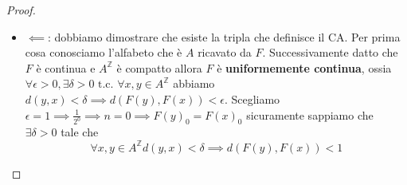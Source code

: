 \begin{teorema} 
\begin{proof}
\begin{itemize}
                  con $\delta=\frac{1}{2^{n+r}}$ è vera. Perché per la prima proprietà
                  della distanza e per la sua definizione (vedi nota \ref{prop:dist}) abbiamo che $d(F(y),F(x)) < \frac{1}{2^{n}}$
                  quindi significa che $F(x)_{[-n,n]} = F(y)_{[-n,n]}$ quindi per
                  $\delta=\frac{1}{2^{n+r}}$ è vero che $d(y,x) < \frac{1}{2^{n+r}}$
                  che significa sempre per la stessa proprietà che $x_{[-n-r,n+r]} = y_{[-n-r,n+r]}$.
                  Tutto viene spiegato dal fatto che se non fossero uguali le sottosequenze
                  di $x$ e $y$ allora non possono essere uguali le sottosequenze di $F(x), F(y)$.
                  Abbiamo dimostrato la continuità.

                  Successivamente dimostriamo $F\circ \sigma = \sigma \circ F\implies F(\sigma(x)) = \sigma(F(x)), \forall x \in A^\mathbb{Z}$.
                  l'uguaglianza precedente può essere riscritta come $\forall x \in A^\mathbb{Z}, \forall i \in \mathbb{Z}, (F(\sigma(x)))_i =(\sigma(F(x)))_i$.
                  Possiamo notare che
                  $$(F(\sigma(x)))_i = f(\sigma(x)_{[i-r,i+r]})=f(x_{[i-r+1,i+r+1]})$$
                  Inoltre
                  $$(\sigma(F(x)))_i =F(x)_{i+1} =f(x_{[i+1-r,i+1+r]})$$
                  Abbiamo dimostrato che commutano.
                  Successivamente dimostriamo $F\circ \sigma = \sigma \circ F\implies F(\sigma(x)) = \sigma(F(x)), \forall x \in A^\mathbb{Z}$.
                  l'uguaglianza precedente può essere riscritta come $\forall x \in A^\mathbb{Z}, \forall i \in \mathbb{Z}, (F(\sigma(x)))_i =(\sigma(F(x)))_i$.
                  Possiamo notare che
                  $$(F(\sigma(x)))_i = f(\sigma(x)_{[i-r,i+r]})=f(x_{[i-r+1,i+r+1]})$$
                  Inoltre
                  $$(\sigma(F(x)))_i =F(x)_{i+1} =f(x_{[i+1-r,i+1+r]})$$
                  Abbiamo dimostrato che commutano.
            \item $\impliedby$: dobbiamo dimostrare che esiste la tripla che definisce il CA.
                  Per prima cosa conosciamo l'alfabeto che è $A$ ricavato da $F$. Successivamente
                  datto che $F$ è continua e $A^\mathbb{Z}$ è compatto allora $F$ è \textbf{uniformemente
                      continua}, ossia $\forall\epsilon >0,\exists \delta > 0 \text{ t.c. } \forall x,y \in A^\mathbb{Z}$
                  abbiamo $d(y,x)<\delta \implies d(F(y), F(x)) < \epsilon$. Scegliamo $\epsilon = 1\implies \frac{1}{2^0}\implies n=0\implies F(y)_0= F(x)_0$
                  sicuramente sappiamo che $\exists \delta >0$ tale che $$\forall x,y \in A^\mathbb{Z} d(y,x)<\delta \implies d(F(y), F(x)) < 1$$

\end{itemize}
\end{proof}
\end{teorema}
